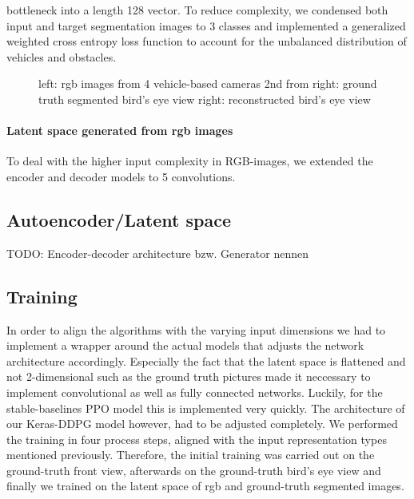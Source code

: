 \documentclass[letterpaper, 10 pt, conference]{ieeeconf}  %
\begin{document}
bottleneck into a length 128 vector. To reduce complexity, we condensed both input and target segmentation images to 3 classes 
and implemented a generalized weighted cross entropy\cite{zhangGeneralizedCrossEntropy2018} loss function to 
account for the unbalanced distribution of vehicles and obstacles.
\begin{figure}[thpb]
   \centering
   \caption{left: rgb images from 4 vehicle-based cameras
            \newline 2nd from right: ground truth segmented bird's eye view
            \newline right: reconstructed bird's eye view}
       \label{figurelabel} 
       \end{figure}

\paragraph{Latent space generated from rgb images} To deal with the higher input complexity in RGB-images, we extended the
encoder and decoder models to 5 convolutions.
       
\subsection{Autoencoder/Latent space}
TODO: Encoder-decoder architecture bzw. Generator nennen
\subsection{Training}
In order to align the algorithms with the varying input dimensions we had to implement a wrapper around the actual models that adjusts the network architecture accordingly. Especially the fact that the latent space is flattened and not 2-dimensional such as the ground truth pictures made it neccessary to implement convolutional as well as  fully connected networks. Luckily, for the stable-baselines PPO model this is implemented very quickly. The architecture of our Keras-DDPG model however, had to be adjusted completely. 
We performed the training in four process steps, aligned with the input representation types mentioned previously. Therefore, the initial training was carried out on the ground-truth front view, afterwards on the ground-truth bird's eye view and finally we trained on the latent space of rgb and ground-truth segmented images. 
\end{document}
